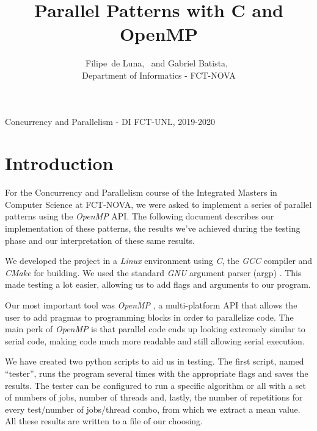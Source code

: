 \documentclass[10pt,journal]{IEEEtran}
\begin{document}

\title{Parallel Patterns with C and OpenMP}


\author{
	{
		Filipe~de Luna,~ and
        Gabriel Batista,~
    } \\ Department of Informatics - FCT-NOVA
        
}

%
{Concurrency and Parallelism - DI FCT-UNL, 2019-2020}

\maketitle

\section{Introduction}
For the Concurrency and Parallelism course of the Integrated Masters in Computer Science at FCT-NOVA, we were asked to implement a series of parallel patterns using the \textit{OpenMP} API. The following document describes our implementation of these patterns, the results we’ve achieved during the testing phase and our interpretation of these same results.

\medskip

We developed the project in a \textit{Linux} environment using \textit{C}, the \textit{GCC} compiler and \textit{CMake} for building. We used the standard \textit{GNU} argument parser (argp) \cite{argp}. This made testing a lot easier, allowing us to add flags and arguments to our program.

Our most important tool was \textit{OpenMP} \cite{omp}, a multi-platform API that allows the user to add pragmas to programming blocks in order to parallelize code. The main perk of \textit{OpenMP} is that parallel code ends up looking extremely similar to serial code, making code much more readable and still allowing serial execution.

\medskip

We have created two python scripts to aid us in testing. The first script, named “tester”, runs the program several times with the appropriate flags and saves the results. The tester can be configured to run a specific algorithm or all with a set of numbers of jobs, number of threads and, lastly, the number of repetitions for every test/number of jobs/thread combo, from which we extract a mean value. All these results are written to a file of our choosing.
\end{document}

